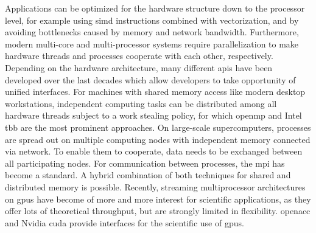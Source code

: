 
Applications can be optimized for the hardware structure down to the processor level, for example using \gls{simd} instructions combined with vectorization, and by avoiding bottlenecks caused by memory and network bandwidth.
Furthermore, modern multi-core and multi-processor systems require parallelization to make hardware threads and processes cooperate with each other, respectively. %
Depending on the hardware architecture, many different \glspl{api} have been developed over the last decades which allow developers to take opportunity of unified interfaces.
For machines with shared memory access like modern desktop workstations, independent computing tasks can be distributed among all hardware threads subject to a work stealing policy, for which \gls{openmp}\textsuperscript{\textregistered} \textcite{openmp50} and Intel\textsuperscript{\textregistered} \gls{tbb} \textcite{tbb2018} are the most prominent approaches.
On large-scale supercomputers, processes are spread out on multiple computing nodes with independent memory connected via network. To enable them to cooperate, data needs to be exchanged between all participating nodes. For communication between processes, the \gls{mpi} \textcite{mpi31} has become a standard. A hybrid combination of both techniques for shared and distributed memory is possible.
Recently, streaming multiprocessor architectures on \glspl{gpu} have become of more and more interest for scientific applications, as they offer lots of theoretical throughput, but are strongly limited in flexibility. \gls{openacc}\textsuperscript{\textregistered} \textcite{openacc27} and Nvidia\textsuperscript{\textregistered} \gls{cuda}\textsuperscript{\textregistered} \textcite{cuda10} provide interfaces for the scientific use of \glspl{gpu}.


